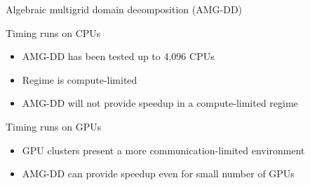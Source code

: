 \documentclass[18pt,xcolor=table]{beamer}
\begin{document}
%
%
%
%
%

\begin{frame}{Algebraic multigrid domain decomposition (AMG-DD)}
\begin{block}{Timing runs on CPUs}
\begin{itemize}
\item AMG-DD has been tested up to 4,096 CPUs
\item Regime is compute-limited
\item AMG-DD will not provide speedup in a compute-limited regime
\end{itemize}
\end{block}

\begin{block}{Timing runs on GPUs}
\begin{itemize}
\item GPU clusters present a more communication-limited environment
\item AMG-DD can provide speedup even for small number of GPUs
\end{itemize}
\end{block}

\end{frame}
\end{document}
